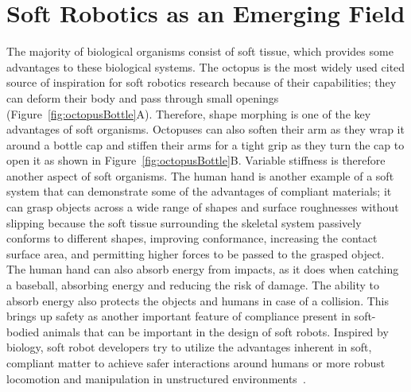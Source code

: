 \section{Soft Robotics as an Emerging Field}
\label{sec:emerging}
The majority of biological organisms consist of soft tissue, which provides some advantages to these biological systems. The octopus is the most widely used cited source of inspiration for soft robotics research because of their capabilities; they can deform their body and pass through small openings (Figure~\ref{fig:octopusBottle}A). Therefore, shape morphing is one of the key advantages of soft organisms. Octopuses can also soften their arm as they wrap it around a bottle cap and stiffen their arms for a tight grip as they turn the cap to open it as shown in Figure~\ref{fig:octopusBottle}B. Variable stiffness is therefore another aspect of soft organisms. The human hand is another example of a soft system that can demonstrate some of the advantages of compliant materials; it can grasp objects across a wide range of shapes and surface roughnesses without slipping because the soft tissue surrounding the skeletal system passively conforms to different shapes, improving conformance, increasing the contact surface area, and permitting higher forces to be passed to the grasped object. The human hand can also absorb energy from impacts, as it does when catching a baseball, absorbing energy and reducing the risk of damage. The ability to absorb energy also protects the objects and humans in case of a collision. This brings up safety as another important feature of compliance present in soft-bodied animals  that can be important in the design of soft robots. Inspired by biology, soft robot developers try to utilize the advantages inherent in soft, compliant matter to achieve safer interactions around humans or more robust locomotion and manipulation in unstructured environments~\cite{martinez2013,laschi2012,Tolley2014d,AdamBilodeau2015}.	

